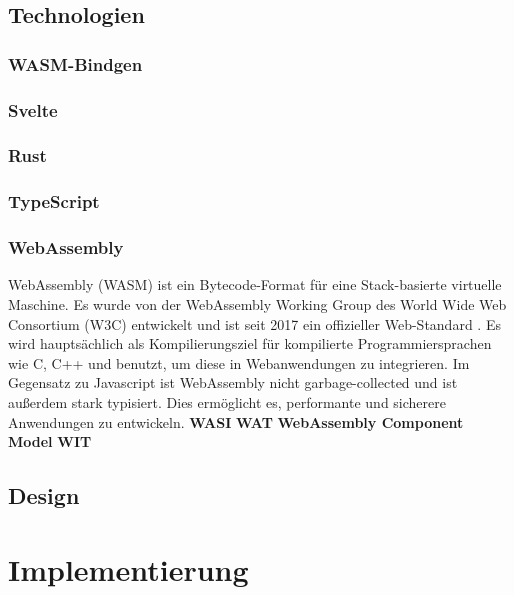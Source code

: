 \documentclass[ngerman]{article}
\begin{document}
\subsection{Technologien}
\subsubsection{WASM-Bindgen}
\label{sec:WASM-Bindgen}
\subsubsection{Svelte}
\label{sec:Svelte}
\subsubsection{Rust}
\label{sec:Rust}
\subsubsection{TypeScript}
\label{sec:TypeScript}
\subsubsection{WebAssembly}
WebAssembly (WASM) ist ein Bytecode-Format für eine Stack-basierte virtuelle Maschine. Es wurde von der WebAssembly Working Group des World Wide Web Consortium (W3C) entwickelt und ist seit 2017 ein offizieller Web-Standard \cite{Haas2017}. 
\br
Es wird hauptsächlich als Kompilierungsziel für kompilierte Programmiersprachen wie C, C++ und  benutzt, um diese in Webanwendungen zu integrieren. Im Gegensatz zu Javascript ist WebAssembly nicht garbage-collected und ist außerdem stark typisiert. Dies ermöglicht es, performante und sicherere Anwendungen zu entwickeln.
\linebreak
\textbf{WASI}
\linebreak
\textbf{WAT}
\linebreak
\textbf{WebAssembly Component Model}
\linebreak
\textbf{WIT}

\subsection{Design}

\section{Implementierung}
\end{document}
